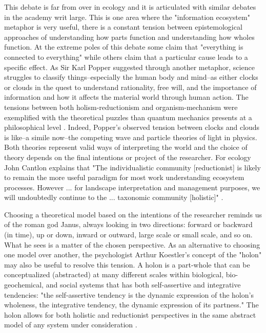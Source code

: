 This debate is far from over in ecology and it is articulated with similar debates in the academy writ large. This is one area where the "information ecosystem" metaphor is very useful, there is a constant tension between epistemological approaches of understanding how  parts function and understanding how wholes function. At the extreme poles of this debate some claim that "everything is connected to everything" \citep{commoner_1971} while others claim that a particular cause leads to a specific effect. As Sir Karl Popper suggested through another metaphor, science struggles to classify things--especially the human body and mind--as either clocks or clouds in the quest to understand rationality, free will, and the importance of information and how it affects the material world through human action. The tensions between both holism-reductionism and organism-mechanism were exemplified with the theoretical puzzles than quantum mechanics presents at a philosophical level \citep{popper_1966}. Indeed, Popper's observed tension between clocks and clouds is like--a simile now--the competing wave and particle theories of light in physics. Both theories represent valid ways of interpreting the world and the choice of theory depends on the final intentions or project of the researcher. For ecology John Cantlon explains that "The individualistic community [reductionist] is likely to remain the more useful paradigm for most work understanding ecosystem processes. However ... for landscape interpretation and management purposes, we will undoubtedly continue to the ... taxonomic community [holistic]" \citep[Cantlon 1996, cited in ][p. 241]{barbour_1996}. 

Choosing a theoretical model based on the intentions of the researcher reminds us of the roman god Janus, always looking in two directions: forward or backward (in time), up or down, inward or outward, large scale or small scale, and so on. What he sees is a matter of the chosen perspective. As an alternative to choosing one model over another, the psychologist Arthur Koestler's concept of the "holon" may also be useful to resolve this tension. A holon is a part-whole that can be conceptualized (abstracted) at many different scales within biological, bio-geochemical, and social systems that has both self-assertive and integrative tendencies: "the self-assertive tendency is the dynamic expression of the holon's wholeness, the integrative tendency, the dynamic expression of its partness." The holon allows for both holistic and reductionist perspectives in the same abstract model of any system under consideration \citep[][p. 56] {koestler_1967}.

